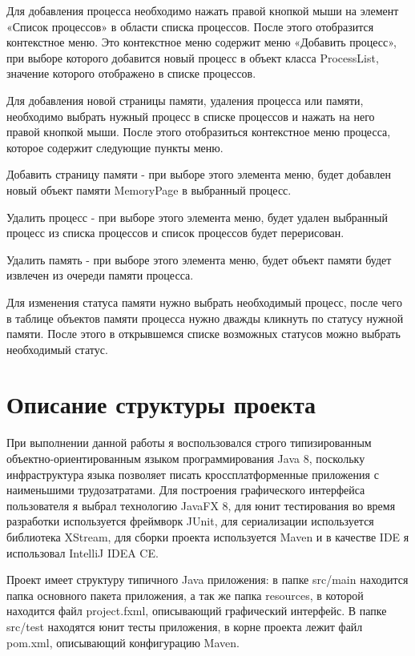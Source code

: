 \documentclass[russian,utf8,simple,hpadding=10mm,vpadding=20mm]{eskdtext}
\begin{document}
Для добавления процесса необходимо нажать правой кнопкой мыши на элемент «Список процессов» в области списка процессов. После этого отобразится контекстное меню. Это контекстное меню содержит меню «Добавить процесс», при выборе которого добавится новый процесс в объект класса ProcessList, значение которого отображено в списке процессов. 

Для добавления новой страницы памяти, удаления процесса или памяти, необходимо выбрать нужный процесс в списке процессов и нажать на него правой кнопкой мыши. После этого отобразиться контекстное меню процесса, которое содержит следующие пункты меню.

Добавить страницу памяти - при выборе этого элемента меню, будет добавлен новый объект памяти MemoryPage в выбранный процесс.

Удалить процесс - при выборе этого элемента меню, будет удален выбранный процесс из списка процессов и список процессов будет перерисован.

Удалить память - при выборе этого элемента меню, будет объект памяти будет извлечен из очереди памяти процесса.

Для изменения статуса памяти нужно выбрать необходимый процесс, после чего в таблице объектов памяти процесса нужно дважды кликнуть по статусу нужной памяти. После этого в открывшемся списке возможных статусов можно выбрать необходимый статус.

\newpage
\parindent=15mm
\section{Описание структуры проекта}

При выполнении данной работы я воспользовался строго типизированным объектно-ориентированным языком программирования Java 8, поскольку инфраструктура языка позволяет писать кроссплатформенные приложения с наименьшими трудозатратами. Для построения графического интерфейса пользователя я выбрал технологию JavaFX 8, для юнит тестирования во время разработки используется фреймворк JUnit, для сериализации используется библиотека XStream, для сборки проекта используется Maven и в качестве IDE я использовал IntelliJ IDEA CE.

Проект имеет структуру типичного Java приложения: в папке src/main находится папка основного пакета приложения, а так же папка resources, в которой находится файл project.fxml, описывающий графический интерфейс. В папке src/test находятся юнит тесты приложения, в корне проекта лежит файл pom.xml, описывающий конфигурацию Maven.
\end{document}
